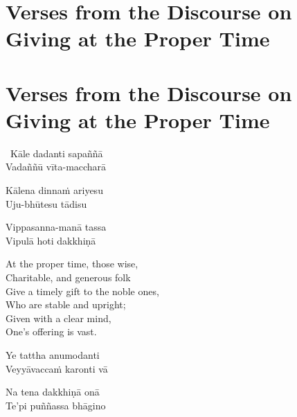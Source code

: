 \suttaRef{[AN 5.32]}

\clearpage



\ifninebythirteen
\section[Verses from the Discourse on Giving\\ at the Proper Time]{Verses from the Discourse on Giving at the Proper Time}
  \else
\section{Verses from the Discourse on Giving at the Proper Time}
\fi
\label{giving-at-proper-time}

\begin{pali-hang-together}
  \anglebracketleft\ \hspace{-0.5mm}Kāle dadanti sapaññā \hspace{-0.5mm}\anglebracketright\ \\
  Vadaññū vīta-maccharā
\end{pali-hang-together}
\begin{pali-hang-together}
  Kālena dinnaṁ ariyesu\\
  Uju-bhūtesu tādisu
\end{pali-hang-together}
\begin{pali-hang-together}
  Vippasanna-manā tassa\\
  Vipulā hoti dakkhiṇā
\end{pali-hang-together}

\begin{english-verses}
  At the proper time, those wise,\\
  Charitable, and generous folk\\
  Give a timely gift to the noble ones,\\
  Who are stable and upright;\\
  Given with a clear mind,\\
  One's offering is vast.\\
\end{english-verses}

\begin{pali-hang}
  Ye tattha anumodanti\\
  Veyyāvaccaṁ karonti vā
\end{pali-hang}
\begin{pali-hang-together}
  Na tena dakkhiṇā onā\\
  Te'pi puññassa bhāgino
\end{pali-hang-together}

